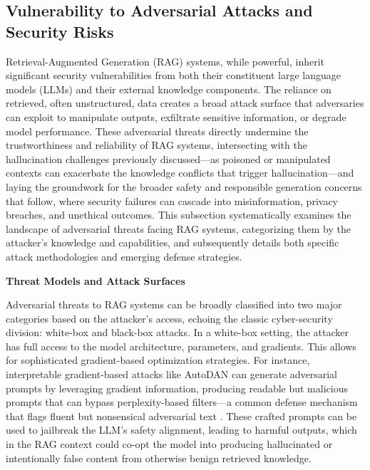 \documentclass[11pt]{article}
\begin{document}
\subsection{Vulnerability to Adversarial Attacks and Security Risks}

Retrieval-Augmented Generation (RAG) systems, while powerful, inherit significant security vulnerabilities from both their constituent large language models (LLMs) and their external knowledge components. The reliance on retrieved, often unstructured, data creates a broad attack surface that adversaries can exploit to manipulate outputs, exfiltrate sensitive information, or degrade model performance. These adversarial threats directly undermine the trustworthiness and reliability of RAG systems, intersecting with the hallucination challenges previously discussed---as poisoned or manipulated contexts can exacerbate the knowledge conflicts that trigger hallucination---and laying the groundwork for the broader safety and responsible generation concerns that follow, where security failures can cascade into misinformation, privacy breaches, and unethical outcomes. This subsection systematically examines the landscape of adversarial threats facing RAG systems, categorizing them by the attacker's knowledge and capabilities, and subsequently details both specific attack methodologies and emerging defense strategies.

\textbf{Threat Models and Attack Surfaces}

Adversarial threats to RAG systems can be broadly classified into two major categories based on the attacker's access, echoing the classic cyber-security division: white-box and black-box attacks. In a white-box setting, the attacker has full access to the model architecture, parameters, and gradients. This allows for sophisticated gradient-based optimization strategies. For instance, interpretable gradient-based attacks like AutoDAN can generate adversarial prompts by leveraging gradient information, producing readable but malicious prompts that can bypass perplexity-based filters---a common defense mechanism that flags fluent but nonsensical adversarial text \cite{ref152}. These crafted prompts can be used to jailbreak the LLM's safety alignment, leading to harmful outputs, which in the RAG context could co-opt the model into producing hallucinated or intentionally false content from otherwise benign retrieved knowledge.
\end{document}
